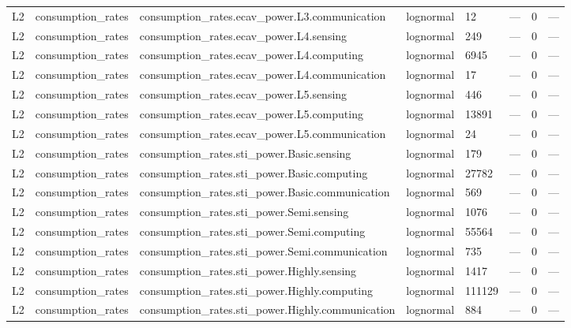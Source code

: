 \begin{longtable}{llllllll}
L2 & consumption\_rates & consumption\_rates.ecav\_power.L3.communication & lognormal & 12 & --- & 0 & --- \\
L2 & consumption\_rates & consumption\_rates.ecav\_power.L4.sensing & lognormal & 249 & --- & 0 & --- \\
L2 & consumption\_rates & consumption\_rates.ecav\_power.L4.computing & lognormal & 6945 & --- & 0 & --- \\
L2 & consumption\_rates & consumption\_rates.ecav\_power.L4.communication & lognormal & 17 & --- & 0 & --- \\
L2 & consumption\_rates & consumption\_rates.ecav\_power.L5.sensing & lognormal & 446 & --- & 0 & --- \\
L2 & consumption\_rates & consumption\_rates.ecav\_power.L5.computing & lognormal & 13891 & --- & 0 & --- \\
L2 & consumption\_rates & consumption\_rates.ecav\_power.L5.communication & lognormal & 24 & --- & 0 & --- \\
L2 & consumption\_rates & consumption\_rates.sti\_power.Basic.sensing & lognormal & 179 & --- & 0 & --- \\
L2 & consumption\_rates & consumption\_rates.sti\_power.Basic.computing & lognormal & 27782 & --- & 0 & --- \\
L2 & consumption\_rates & consumption\_rates.sti\_power.Basic.communication & lognormal & 569 & --- & 0 & --- \\
L2 & consumption\_rates & consumption\_rates.sti\_power.Semi.sensing & lognormal & 1076 & --- & 0 & --- \\
L2 & consumption\_rates & consumption\_rates.sti\_power.Semi.computing & lognormal & 55564 & --- & 0 & --- \\
L2 & consumption\_rates & consumption\_rates.sti\_power.Semi.communication & lognormal & 735 & --- & 0 & --- \\
L2 & consumption\_rates & consumption\_rates.sti\_power.Highly.sensing & lognormal & 1417 & --- & 0 & --- \\
L2 & consumption\_rates & consumption\_rates.sti\_power.Highly.computing & lognormal & 111129 & --- & 0 & --- \\
L2 & consumption\_rates & consumption\_rates.sti\_power.Highly.communication & lognormal & 884 & --- & 0 & --- \\
\end{longtable}
